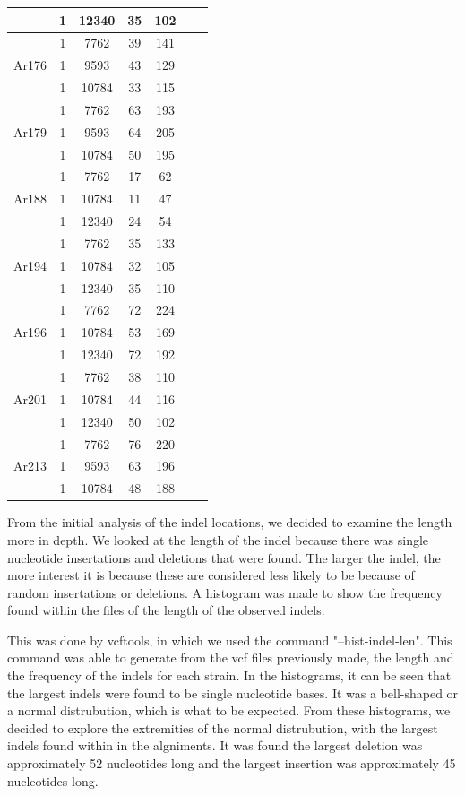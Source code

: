 \documentclass[../main.tex]{subfiles}
\begin{document}
\begin{table}[H]
\begin{center}
\begin{singlespace}
{\begin{tabular}{ |c|c|c|c|c|c|c| }
		& 1 & 12340 & 35 & 102 \\ 
		\hline
		\multirow{3}{4em}{Ar176} & 1 & 7762 & 39 & 141 \\ 
		& 1 & 9593 & 43 & 129  \\ 
		& 1 & 10784 & 33 & 115 \\ 
		\hline
		\multirow{3}{4em}{Ar179} & 1 & 7762 & 63 & 193 \\ 
		& 1 & 9593 & 64 & 205  \\ 
		& 1 & 10784 & 50 & 195 \\ 
		\hline
		\multirow{3}{4em}{Ar188} & 1 & 7762 & 17 & 62 \\ 
		& 1 & 10784 & 11 & 47  \\ 
		& 1 & 12340 & 24 & 54 \\ 
		\hline
		\multirow{3}{4em}{Ar194} & 1 & 7762 & 35 & 133 \\ 
		& 1 & 10784 & 32 & 105  \\ 
		& 1 & 12340 & 35 & 110 \\ 
		\hline
		\multirow{3}{4em}{Ar196} & 1 & 7762 & 72 & 224 \\ 
		& 1 & 10784 & 53 & 169  \\ 
		& 1 & 12340 & 72 & 192 \\ 
		\hline
		\multirow{3}{4em}{Ar201} & 1 & 7762 & 38 & 110 \\ 
		& 1 & 10784 & 44 & 116  \\ 
		& 1 & 12340 & 50 & 102 \\ 
		\hline
		\multirow{3}{4em}{Ar213} & 1 & 7762 & 76 & 220 \\ 
		& 1 & 9593 & 63 & 196  \\ 
		& 1 & 10784 & 48 & 188 \\ 
		\hline
	\end{tabular}
	}
	\end{singlespace}
\end{center}
\end{table}

From the initial analysis of the indel locations, we decided to examine the length more in depth. We looked at the length of the indel because there was single nucleotide insertations and deletions that were found. The larger the indel, the more interest it is because these are considered less likely to be because of random insertations or deletions. A histogram was made to show the frequency found within the files of the length of the observed indels. 

This was done by vcftools, in which we used the command "--hist-indel-len". This command was able to generate from the vcf files previously made, the length and the frequency of the indels for each strain. In the histograms, it can be seen that the largest indels were found to be single nucleotide bases. It was a bell-shaped or a normal distrubution, which is what to be expected. From these histograms, we decided to explore the extremities of the normal distrubution, with the largest indels found within in the algniments. It was found the largest deletion was approximately 52 nucleotides long and the largest insertion was approximately 45 nucleotides long.  
\end{document}
